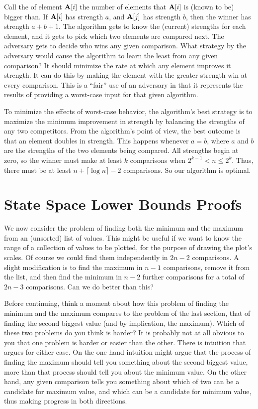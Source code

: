 Call the  of element \({\textbf{A}}[i]\) the number of
elements that \({\textbf{A}}[i]\) is (known to be) bigger than.
If \({\textbf{A}}[i]\) has strength \(a\), and \({\textbf{A}}[j]\) has
strength \(b\), then the winner has strength \(a + b + 1\).
The algorithm gets to know the (current) strengths for each element,
and it gets to pick which two elements are compared next.
The adversary gets to decide who wins any given comparison.
What strategy by the adversary would cause the algorithm to learn the
least from any given comparison?
It should minimize the rate at which any element improves it strength.
It can do this by making the element with the greater strength win at
every comparison.
This is a ``fair'' use of an adversary in that it represents the
results of providing a worst-case input for that given algorithm.

\newpage

To minimize the effects of worst-case behavior, the algorithm's best
strategy is to maximize the minimum improvement in strength by
balancing the strengths of any two competitors.
From the algorithm's point of view, the best outcome is that an
element doubles in strength.
This happens whenever \(a = b\), where \(a\) and \(b\) are the
strengths of the two elements being compared.
All strengths begin at zero, so the winner must make at least
\(k\) comparisons when \(2^{k-1} < n \leq 2^k\).
Thus, there must be at least \(n + \lceil \log n\rceil - 2\) comparisons.
So our algorithm is optimal.

\section{State Space Lower Bounds Proofs}
\label{StateSpace}

We now consider the problem of finding both the minimum and the
maximum from an (unsorted) list of values.
This might be useful if we want to know the range of a collection of
values to be plotted, for the purpose of drawing the plot's scales.
Of course we could find them independently in \(2n-2\) comparisons.
A slight modification is to find the maximum in \(n-1\) comparisons,
remove it from the list, and then find the minimum in \(n-2\) further
comparisons for a total of \(2n-3\) comparisons.
Can we do better than this?

Before continuing, think a moment about how this problem of finding
the minimum and the maximum compares to the problem of the last
section, that of finding the second biggest value
(and by implication, the maximum).
Which of these two problems do you think is harder?
It is probably not at all obvious to you that one problem is harder or
easier than the other.
There is intuition that argues for either case.
On the one hand intuition might argue that the process of finding the
maximum should tell you something about the second biggest value, more
than that process should tell you about the minimum value.
On the other hand, any given comparison tells you something about
which of two can be a candidate for maximum value, and which can be a
candidate for minimum value, thus making progress in both directions.

